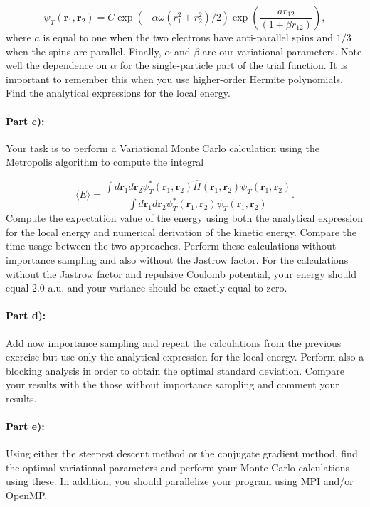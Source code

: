 \documentclass[oneside,final,a4wide,10pt]{article}
\begin{document}
\begin{equation}
   \psi_{T}(\bm{r}_1,\bm{r}_2) = 
   C\exp{\left(-\alpha\omega(r_1^2+r_2^2)/2\right)}
   \exp{\left(\frac{ar_{12}}{(1+\beta r_{12})}\right)}, 
\label{eq:trial}
\end{equation}
where $a$ is equal to one when the two electrons have anti-parallel spins and $1/3$ when the spins are parallel. Finally, $\alpha$ and $\beta$ are our variational parameters. Note well the dependence on $\alpha$ for the single-particle part of the trial function. It is important to remember this when you use higher-order Hermite polynomials.
Find the analytical expressions for the local energy.


\paragraph{Part  c):}
Your task is to perform a Variational Monte Carlo calculation
using the Metropolis algorithm to compute the integral

\begin{equation}
   \langle E \rangle =
   \frac{\int d\bm{r}_1d\bm{r}_2\psi^{\ast}_T(\bm{r}_1,\bm{r}_2)\hat{H}(\bm{r}_1,\bm{r}_2)\psi_T(\bm{r}_1,\bm{r}_2)}
        {\int d\bm{r}_1d\bm{r}_2\psi^{\ast}_T(\bm{r}_1,\bm{r}_2)\psi_T(\bm{r}_1,\bm{r}_2)}.
\end{equation}
Compute the expectation value of the energy using both the analytical expression for the local energy and numerical derivation of the kinetic energy. Compare the time usage between the two approaches.
Perform these calculations without importance sampling and also without the Jastrow factor. For the calculations without the Jastrow factor and repulsive Coulomb potential, your energy should equal 2.0 a.u. and your variance should be exactly equal to zero.

\paragraph{Part  d):}
Add now importance sampling and repeat the calculations from the previous exercise but use only
the analytical expression for the local energy. Perform also a blocking analysis in order to obtain the optimal
standard deviation. Compare your results with the those without importance sampling and comment your results.

\paragraph{Part  e):}
Using either the steepest descent method or the conjugate gradient method, find the optimal variational 
parameters and perform your Monte Carlo calculations using these.  
In addition, you should parallelize your program using MPI and/or OpenMP.
\end{document}
